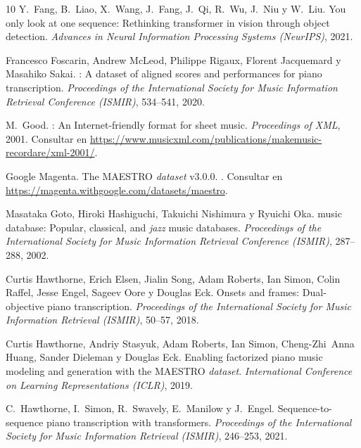 \documentclass[11pt,spanish,listoffigures,listoftables]{tfgetsinf}
\begin{document}
\begin{thebibliography}{10}
Y.~Fang, B.~Liao, X.~Wang, J.~Fang, J.~Qi, R.~Wu, J.~Niu y W.~Liu.
\newblock You only look at one sequence: Rethinking transformer in vision through object detection.
\newblock \textit{Advances in Neural Information Processing Systems (NeurIPS)}, 2021.


Francesco Foscarin, Andrew McLeod, Philippe Rigaux, Florent Jacquemard y Masahiko Sakai.
: A dataset of aligned scores and performances for piano transcription.
\newblock \textit{Proceedings of the International Society for Music Information Retrieval Conference (ISMIR)}, 534--541, 2020.

M.~Good.
: An Internet-friendly format for sheet music.
\newblock \textit{Proceedings of XML}, 2001.
\newblock Consultar en \url{https://www.musicxml.com/publications/makemusic-recordare/xml-2001/}.

{Google Magenta}.
\newblock The {MAESTRO} \textit{dataset} v3.0.0.
.
\newblock Consultar en \url{https://magenta.withgoogle.com/datasets/maestro}.

Masataka Goto, Hiroki Hashiguchi, Takuichi Nishimura y Ryuichi Oka.
 music database: Popular, classical, and \textit{jazz} music databases.
\newblock \textit{Proceedings of the International Society for Music Information Retrieval Conference (ISMIR)}, 287--288, 2002.

Curtis Hawthorne, Erich Elsen, Jialin Song, Adam Roberts, Ian Simon, Colin Raffel, Jesse Engel, Sageev Oore y Douglas Eck.
\newblock Onsets and frames: Dual-objective piano transcription.
\newblock \textit{Proceedings of the International Society for Music Information Retrieval (ISMIR)}, 50--57, 2018.

Curtis Hawthorne, Andriy Stasyuk, Adam Roberts, Ian Simon, Cheng-Zhi~Anna Huang, Sander Dieleman y Douglas Eck.
\newblock Enabling factorized piano music modeling and generation with the {MAESTRO} \textit{dataset}.
\newblock \textit{International Conference on Learning Representations (ICLR)}, 2019.

C.~Hawthorne, I.~Simon, R.~Swavely, E.~Manilow y J.~Engel.
\newblock Sequence-to-sequence piano transcription with transformers.
\newblock \textit{Proceedings of the International Society for Music Information Retrieval (ISMIR)}, 246--253, 2021.


\end{thebibliography}
\end{document}
